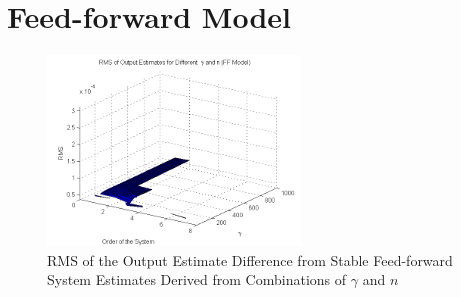 \section{Feed-forward Model}
\begin{figure}[h]
\centering
\includegraphics[width=0.6\textwidth]{pics/RMS_FF}
\caption{RMS of the Output Estimate Difference from Stable Feed-forward System Estimates Derived from Combinations of $\gamma$ and $n$}
\label{fig:RMS_FB}
\end{figure}











%

%
%
%

%
%
%
 
 

